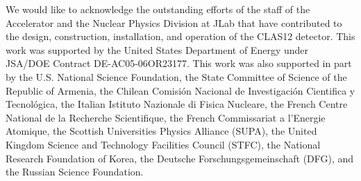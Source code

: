 \documentclass[final,3p,twocolumn]{elsarticle}
\begin{document}
\vspace{0,5cm}


\vspace{0.3cm}

We would like to acknowledge the outstanding efforts of the staff of the Accelerator and the Nuclear Physics
Division at JLab that have contributed to the design, construction, installation, and operation of the CLAS12
detector. This work was supported by the United States Department of Energy under JSA/DOE Contract
DE-AC05-06OR23177. This work was also supported in part by the U.S. National Science Foundation, the State
Committee of Science of the Republic of Armenia, the Chilean Comisi\'on Nacional de Investigaci\'on Cientifica y
Tecnol\'ogica, the Italian Istituto Nazionale di Fisica Nucleare, the French Centre National de la Recherche
Scientifique, the French Commissariat a l'Energie Atomique, the Scottish Universities Physics Alliance (SUPA),
the United Kingdom Science and Technology Facilities Council (STFC), the National Research Foundation of Korea,
the Deutsche Forschungsgemeinschaft (DFG), and the Russian Science Foundation. 
\end{document}
